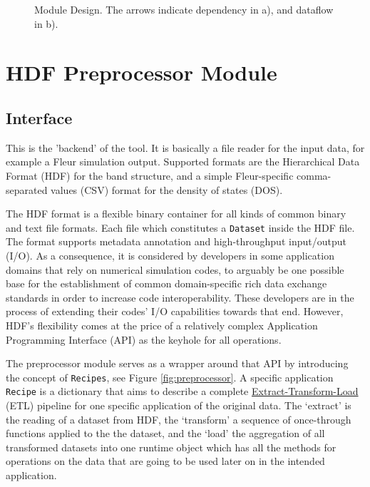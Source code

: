 \begin{figure}[htb!]
    \centering
    \hspace{5em}%
    \caption[Module Design.]{Module Design. The arrows indicate dependency in
      a), and dataflow in b).}
    \label{fig:module-design}
\end{figure}


\section{HDF Preprocessor Module}
\label{sec:preprocessor-module}

\subsection{Interface}
\label{sec:preprocessor-interface}

This is the 'backend' of the tool. It is basically a file reader for the input
data, for example a Fleur simulation output. Supported formats are the
Hierarchical Data Format (HDF) \cite{hdf} for the band structure, and a simple
Fleur-specific comma-separated values (CSV) format for the density of states
(DOS).

The HDF format is a flexible binary container for all kinds of common binary and
text file formats. Each file which constitutes a \texttt{Dataset} inside the HDF
file. The format supports metadata annotation and high-throughput input/output
(I/O). As a consequence, it is considered by developers in some application
domains that rely on numerical simulation codes, to arguably be one possible
base for the establishment of common domain-specific rich data exchange
standards in order to increase code interoperability. These developers are in
the process of extending their codes' I/O capabilities towards that end.
However, HDF's flexibility comes at the price of a relatively complex
Application Programming Interface (API) as the keyhole for all operations.

The preprocessor module serves as a wrapper around that API by introducing the
concept of \texttt{Recipes}, see Figure \ref{fig:preprocessor}. A specific
application \texttt{Recipe} is a dictionary that aims to describe a complete
\href{https://en.wikipedia.org/wiki/Extract,_transform,_load}{Extract-Transform-Load}
(ETL) pipeline for one specific application of the original data. The `extract'
is the reading of a dataset from HDF, the `transform' a sequence of once-through
functions applied to the the dataset, and the `load' the aggregation of all
transformed datasets into one runtime object which has all the methods for
operations on the data that are going to be used later on in the intended
application.

